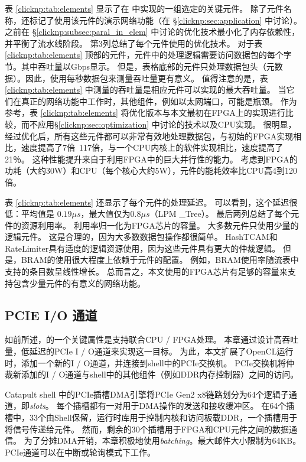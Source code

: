 表 \ref {clicknp:tab:elements} 显示了在 \name 中实现的一组选定的关键元件。
除了元件名称，还标记了使用该元件的演示网络功能（在 \S \ref {clicknp:sec:application} 中讨论）。
之前在 \S \ref {clicknp:subsec:paral_in_elem} 中讨论的优化技术最小化了内存依赖性，并平衡了流水线阶段。
第3列总结了每个元件使用的优化技术。
对于表 \ref {clicknp:tab:elements} 顶部的元件，元件中的处理逻辑需要访问数据包的每个字节。其中吞吐量以Gbps显示。
但是，表格底部的元件只处理数据包头（元数据）。因此，使用每秒数据包来测量吞吐量更有意义。
值得注意的是，表 \ref {clicknp:tab:elements} 中测量的吞吐量是相应元件可以实现的最大吞吐量。
当它们在真正的网络功能中工作时，其他组件，例如以太网端口，可能是瓶颈。
作为参考，表 \ref {clicknp:tab:elements} 将优化版本与本文最初在FPGA上的实现进行比较，而不应用\S \ref {clicknp:sec:optimization} 中讨论的技术以及CPU实现。
很明显，经过优化后，所有这些元件都可以非常有效地处理数据包，与初始的FPGA实现相比，速度提高了7倍~117倍，与一个CPU内核上的软件实现相比，速度提高了21％。
这种性能提升来自于利用FPGA中的巨大并行性的能力。
考虑到FPGA的功耗（大约30W）和CPU（每个核心大约5W），\name 元件的能耗效率比CPU高4到120倍。

表 \ref {clicknp:tab:elements} 还显示了每个元件的处理延迟。
可以看到，这个延迟很低：平均值是 $0.19 \mu s$，最大值仅为$0.8 \mu s$（LPM \_Tree）。
最后两列总结了每个元件的资源利用率。 利用率归一化为FPGA芯片的容量。
大多数元件只使用少量的逻辑元件。
这是合理的，因为大多数数据包操作都很简单。
HashTCAM和RateLimiter具有适度的逻辑资源使用，因为这些元件具有更大的仲裁逻辑。
但是，BRAM的使用很大程度上依赖于元件的配置。 例如，BRAM使用率随流表中支持的条目数呈线性增长。
总而言之，本文使用的FPGA芯片有足够的容量来支持包含少量元件的有意义的网络功能。



\subsection{PCIE I/O 通道}
\label{clicknp:subsec:pcie}

如前所述，\name 的一个关键属性是支持联合CPU / FPGA处理。
本章通过设计高吞吐量，低延迟的PCIe I / O通道来实现这一目标。
为此，本文扩展了OpenCL运行时，添加一个新的I / O通道，并连接到shell中的PCIe交换机。
PCIe交换机将仲裁新添加的I / O通道与shell中的其他组件（例如DDR内存控制器）之间的访问。

Catapult shell \cite {putnam2014reconfigurable}中的PCIe插槽DMA引擎将PCIe Gen2 x8链路划分为64个逻辑子通道，即\textit {slots}。
每个插槽都有一对用于DMA操作的发送和接收缓冲区。
在64个插槽中，33个由Shell保留，运行时库用于控制内核和访问板载DDR，一个插槽用于将信号传递给\name 元件。
然而，剩余的30个插槽用于FPGA和CPU元件之间的数据通信。
为了分摊DMA开销，本章积极地使用\textit {batching}。最大邮件大小限制为64KB。
PCIe通道可以在中断或轮询模式下工作。


